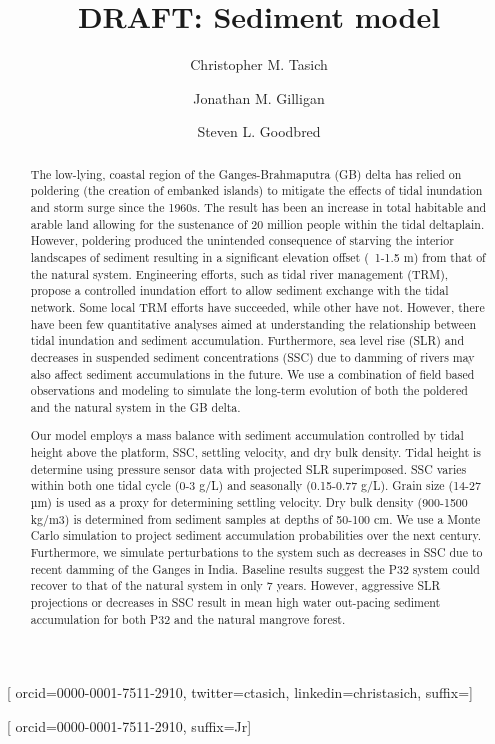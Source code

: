 \title[mode = title]{DRAFT: Sediment model}

\author{Christopher M. Tasich}[
	orcid=0000-0001-7511-2910,
  twitter=ctasich,
  linkedin=christasich,
	suffix=]
\cormark[1]

\author{Jonathan M. Gilligan}
\cormark[2]

\author{Steven L. Goodbred}[
  orcid=0000-0001-7511-2910,
	suffix=Jr]

\address{Department of Earth \& Environmental Sciences, Vanderbilt University, Nashville TN 37235, USA}


\begin{abstract}
    The low-lying, coastal region of the Ganges-Brahmaputra (GB) delta has relied on poldering (the creation of embanked islands) to mitigate the effects of tidal inundation and storm surge since the 1960s. The result has been an increase in total habitable and arable land allowing for the sustenance of 20 million people within the tidal deltaplain. However, poldering produced the unintended consequence of starving the interior landscapes of sediment resulting in a significant elevation offset (~1-1.5 m) from that of the natural system. Engineering efforts, such as tidal river management (TRM), propose a controlled inundation effort to allow sediment exchange with the tidal network. Some local TRM efforts have succeeded, while other have not. However, there have been few quantitative analyses aimed at understanding the relationship between tidal inundation and sediment accumulation.  Furthermore, sea level rise (SLR) and decreases in suspended sediment concentrations (SSC) due to damming of rivers may also affect sediment accumulations in the future. We use a combination of field based observations and modeling to simulate the long-term evolution of both the poldered and the natural system in the GB delta.

    Our model employs a mass balance with sediment accumulation controlled by tidal height above the platform, SSC, settling velocity, and dry bulk density. Tidal height is determine using pressure sensor data with projected SLR superimposed. SSC varies within both one tidal cycle (0-3 g/L) and seasonally (0.15-0.77 g/L). Grain size (14-27 µm) is used as a proxy for determining settling velocity. Dry bulk density (900-1500 kg/m3) is determined from sediment samples at depths of 50-100 cm. We use a Monte Carlo simulation to project sediment accumulation probabilities over the next century. Furthermore, we simulate perturbations to the system such as decreases in SSC due to recent damming of the Ganges in India. Baseline results suggest the P32 system could recover to that of the natural system in only 7 years. However, aggressive SLR projections or decreases in SSC result in mean high water out-pacing sediment accumulation for both P32 and the natural mangrove forest.
  \end{abstract}

